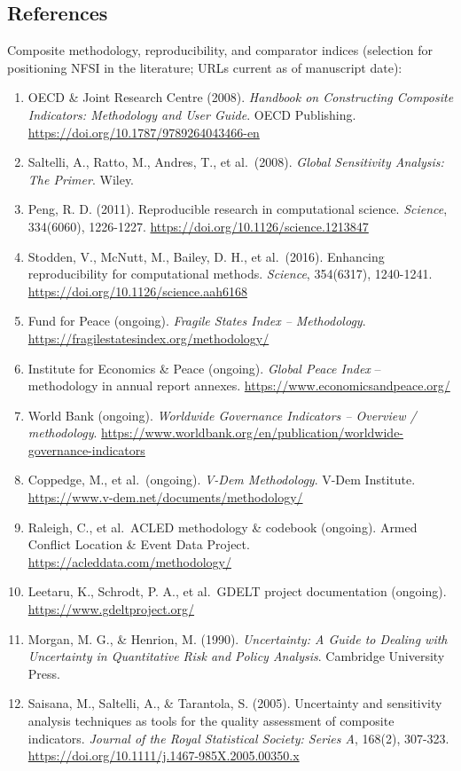\documentclass[
  11pt,
  peerreview,journal,onecolumn]{IEEEtran}
\providecommand{\tightlist}{%
  \setlength{\itemsep}{0pt}\setlength{\parskip}{0pt}}
\begin{document}
\hypertarget{references}{%
\subsection{References}\label{references}}

Composite methodology, reproducibility, and comparator indices
(selection for positioning NFSI in the literature; URLs current as of
manuscript date):

\begin{enumerate}
\def\labelenumi{\arabic{enumi}.}
\tightlist
\item
  OECD \& Joint Research Centre (2008). \emph{Handbook on Constructing
  Composite Indicators: Methodology and User Guide}. OECD Publishing.
  \url{https://doi.org/10.1787/9789264043466-en}
\item
  Saltelli, A., Ratto, M., Andres, T., et al.~(2008). \emph{Global
  Sensitivity Analysis: The Primer}. Wiley.
\item
  Peng, R. D. (2011). Reproducible research in computational science.
  \emph{Science}, 334(6060), 1226-1227.
  \url{https://doi.org/10.1126/science.1213847}
\item
  Stodden, V., McNutt, M., Bailey, D. H., et al.~(2016). Enhancing
  reproducibility for computational methods. \emph{Science}, 354(6317),
  1240-1241. \url{https://doi.org/10.1126/science.aah6168}
\item
  Fund for Peace (ongoing). \emph{Fragile States Index -- Methodology}.
  \url{https://fragilestatesindex.org/methodology/}
\item
  Institute for Economics \& Peace (ongoing). \emph{Global Peace Index}
  -- methodology in annual report annexes.
  \url{https://www.economicsandpeace.org/}
\item
  World Bank (ongoing). \emph{Worldwide Governance Indicators --
  Overview / methodology}.
  \url{https://www.worldbank.org/en/publication/worldwide-governance-indicators}
\item
  Coppedge, M., et al.~(ongoing). \emph{V-Dem Methodology}. V-Dem
  Institute. \url{https://www.v-dem.net/documents/methodology/}
\item
  Raleigh, C., et al.~ACLED methodology \& codebook (ongoing). Armed
  Conflict Location \& Event Data Project.
  \url{https://acleddata.com/methodology/}
\item
  Leetaru, K., Schrodt, P. A., et al.~GDELT project documentation
  (ongoing). \url{https://www.gdeltproject.org/}
\item
  Morgan, M. G., \& Henrion, M. (1990). \emph{Uncertainty: A Guide to
  Dealing with Uncertainty in Quantitative Risk and Policy Analysis}.
  Cambridge University Press.
\item
  Saisana, M., Saltelli, A., \& Tarantola, S. (2005). Uncertainty and
  sensitivity analysis techniques as tools for the quality assessment of
  composite indicators. \emph{Journal of the Royal Statistical Society:
  Series A}, 168(2), 307-323.
  \url{https://doi.org/10.1111/j.1467-985X.2005.00350.x}
\end{enumerate}
\end{document}
